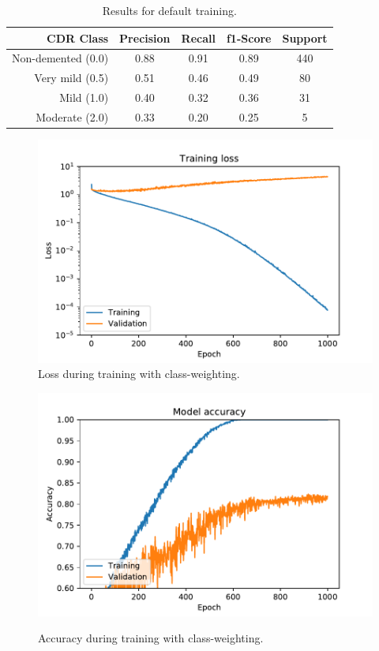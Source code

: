 \documentclass{kththesis}
\begin{document}
\begin{table}[H]
  \begin{center}
    \caption{Results for default training. \label{tab:results_class_weighted}}
    \begin{tabular}{r|ccc|c}
      \textbf{CDR Class} & \textbf{Precision} & \textbf{Recall} & \textbf{f1-Score} & \textbf{Support} \\
      \toprule
      Non-demented (0.0) & 0.88 & 0.91 & 0.89 & 440 \\
      Very mild (0.5)    & 0.51 & 0.46 & 0.49 & 80  \\
      Mild (1.0)         & 0.40 & 0.32 & 0.36 & 31  \\
      Moderate (2.0)     & 0.33 & 0.20 & 0.25 & 5   \\
    \end{tabular}
  \end{center}
\end{table}
\begin{figure}
  \centering
  \includegraphics[width=0.9\linewidth]{img/loss_class_weighted.pdf}
  \caption{Loss during training with class-weighting.}
  \label{fig:loss_default}
  \vspace{-30mm}
\end{figure}
\begin{figure}
  \centering
  \includegraphics[width=0.9\linewidth]{img/accuracy_class_weighted.pdf}
  \label{fig:accuracy_default}
  \caption{Accuracy during training with class-weighting.}
\end{figure}
\end{document}
